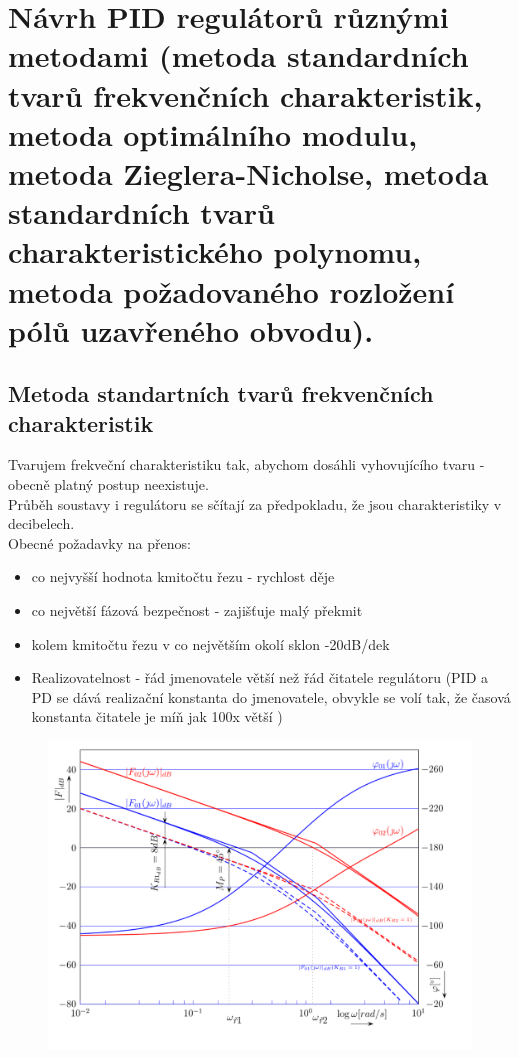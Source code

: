\section{ Návrh PID regulátorů různými metodami (metoda standardních tvarů frekvenčních charakteristik, metoda optimálního
  modulu, metoda Zieglera-Nicholse, metoda standardních tvarů charakteristického polynomu, metoda požadovaného
  rozložení pólů uzavřeného obvodu).}

\subsection*{Metoda standartních tvarů frekvenčních charakteristik}

Tvarujem frekveční charakteristiku tak, abychom dosáhli vyhovujícího tvaru - obecně platný postup neexistuje.\\
Průběh soustavy i regulátoru se sčítají za předpokladu, že jsou charakteristiky v decibelech.\\
Obecné požadavky na přenos:
\begin{itemize}
    \item co nejvyšší hodnota kmitočtu řezu - rychlost děje
    \item co největší fázová bezpečnost - zajišťuje malý překmit
    \item kolem kmitočtu řezu v co největším okolí sklon -20dB/dek
    \item Realizovatelnost - řád jmenovatele větší než řád čitatele regulátoru (PID a PD se dává realizační konstanta do jmenovatele, obvykle se volí tak, že časová konstanta čitatele je míň jak 100x větší )
\end{itemize}
\begin{figure}[H]
    \includegraphics*[scale = 0.8]{images/freqNavrh.png}
\end{figure}
\newpage

